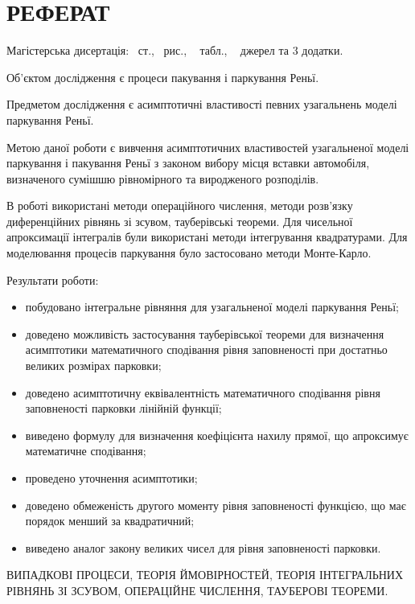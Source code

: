 \chapter*{РЕФЕРАТ}

Магістерська дисертація: \pageref*{MyLastPage}~ст., \totfig~рис., \tottab~ табл., ~ джерел та 3 додатки.

Об'єктом дослідження є процеси пакування і паркування Реньї.

Предметом дослідження є асимптотичні властивості певних узагальнень моделі паркування Реньї.

Метою даної роботи є вивчення асимптотичних властивостей узагальненої моделі паркування і пакування Реньї з законом вибору місця вставки автомобіля, визначеного сумішшю рівномірного та виродженого розподілів.

В роботі використані методи операційного числення, методи розв'язку диференційних рівнянь зі зсувом, тауберівські теореми. Для чисельної апроксимації інтегралів були використані методи інтегрування квадратурами. Для моделювання процесів паркування було застосовано методи Монте-Карло.

Результати роботи:
\begin{itemize}
	\item побудовано інтегральне рівняння для узагальненої моделі паркування Реньї;
	\item доведено можливість застосування тауберівської теореми для визначення асимптотики математичного сподівання рівня заповненості при достатньо великих розмірах парковки;
	\item доведено асимптотичну еквівалентність математичного сподівання рівня заповненості парковки лінійній функції;
	\item виведено формулу для визначення коефіцієнта нахилу прямої, що апроксимує математичне сподівання;
	\item проведено уточнення асимптотики;
	\item доведено обмеженість другого моменту рівня заповненості функцією, що має порядок менший за квадратичний;
	\item виведено аналог закону великих чисел для рівня заповненості парковки.
\end{itemize}

\MakeUppercase{випадкові процеси, теорія ймовірностей, теорія інтегральних рівнянь зі зсувом, операційне числення, тауберові теореми.} 